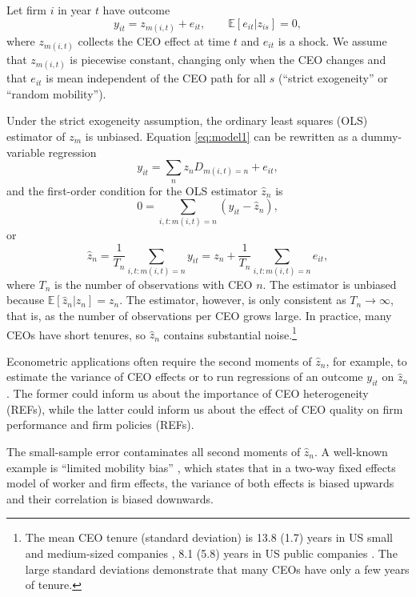 \documentclass[11pt,a4paper]{article}
\begin{document}
Let firm $i$ in year $t$ have outcome
\begin{equation}\label{eq:model1}
  y_{it} = z_{m(i,t)} + e_{it},\qquad \mathbb E[e_{it}|z_{is}]=0,
\end{equation}
where $z_{m(i,t)}$ collects the CEO effect at time $t$ and $e_{it}$ is a shock. We assume that $z_{m(i,t)}$ is piecewise constant, changing only when the CEO changes and that $e_{it}$ is mean independent of the CEO path for all $s$ (``strict exogeneity'' or ``random mobility'').

Under the strict exogeneity assumption, the ordinary least squares (OLS) estimator of $z_m$ is unbiased. Equation \eqref{eq:model1} can be rewritten as a dummy-variable regression 
$$
y_{it} = \sum_{n} z_n D_{m(i,t)=n}  + e_{it},
$$
and the first-order condition for the OLS estimator $\hat z_n$ is
$$
0 = \sum_{i,t:m(i,t)=n} (y_{it} - \hat z_n),
$$
or 
$$
\hat z_n = \frac{1}{T_n} \sum_{i,t:m(i,t)=n} y_{it} = z_n + \frac{1}{T_n} \sum_{i,t:m(i,t)=n} e_{it},
$$
where $T_n$ is the number of observations with CEO $n$. The estimator is unbiased because $\mathbb E[\hat z_n|z_n] = z_n$. The estimator, however, is only consistent as $T_n\to\infty$, that is, as the number of observations per CEO grows large. In practice, many CEOs have short tenures, so $\hat z_n$ contains substantial noise.\footnote{The mean CEO tenure (standard deviation) is 13.8 (1.7) years in US small and medium-sized companies \citep{simsek2007ceo}, 8.1 (5.8) years in US public companies \citep{brookman2009ceo}. The large standard deviations demonstrate that many CEOs have only a few years of tenure.} 

Econometric applications often require the second moments of $\hat z_n$, for example, to estimate the variance of CEO effects or to run regressions of an outcome $y_{it}$ on $\hat z_n$. The former could inform us about the importance of CEO heterogeneity (REFs), while the latter could inform us about the effect of CEO quality on firm performance and firm policies (REFs). 

The small-sample error contaminates all second moments of $\hat z_n$. A well-known example is ``limited mobility bias'' \citep{andrews2008high}, which states that in a two-way fixed effects model of worker and firm effects, the variance of both effects is biased upwards and their correlation is biased downwards.


\newenvironment{example}{\par\noindent\textbf{Example.}\ }{\par}
\end{document}
